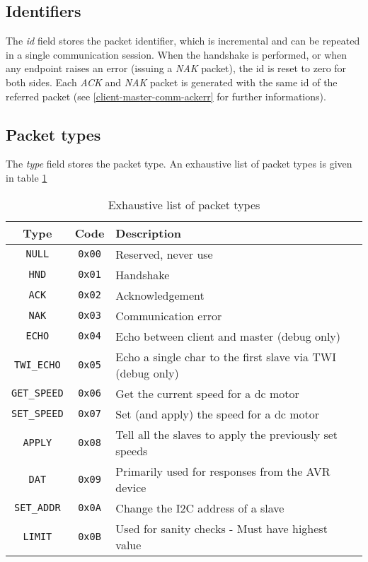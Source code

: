 \subsection{Identifiers}
The \emph{id} field stores the packet identifier, which is incremental and can
be repeated in a single communication session. When the handshake is performed,
or when any endpoint raises an error (issuing a \emph{NAK} packet), the id is
reset to zero for both sides. Each \emph{ACK} and \emph{NAK} packet is
generated with the same id of the referred packet (see
\ref{client-master-comm-ackerr} for further informations).

\subsection{Packet types}
The \emph{type} field stores the packet type. An exhaustive list of packet
types is given in table \ref{tab:packet-types}

\begin{table}[bh]
  \begin{tabularx}{\textwidth}{c c X}
    \toprule
    Type & Code & Description \\
    \midrule
    \texttt{NULL}       & \texttt{0x00} & Reserved, never use \\
    \texttt{HND}        & \texttt{0x01} & Handshake \\
    \texttt{ACK}        & \texttt{0x02} & Acknowledgement \\
    \texttt{NAK}        & \texttt{0x03} & Communication error \\
    \texttt{ECHO}       & \texttt{0x04} & Echo between client and master (debug only)\\
    \texttt{TWI\_ECHO}  & \texttt{0x05} & Echo a single char to the first slave via TWI (debug only)\\
    \texttt{GET\_SPEED} & \texttt{0x06} & Get the current speed for a dc motor \\
    \texttt{SET\_SPEED} & \texttt{0x07} & Set (and apply) the speed for a dc motor \\
    \texttt{APPLY}      & \texttt{0x08} & Tell all the slaves to apply the previously set speeds \\
    \texttt{DAT}        & \texttt{0x09} & Primarily used for responses from the AVR device \\
    \texttt{SET\_ADDR}  & \texttt{0x0A} & Change the I2C address of a slave \\
    \texttt{LIMIT}      & \texttt{0x0B} & Used for sanity checks - Must have highest value \\
    \bottomrule
  \end{tabularx}
  \caption{Exhaustive list of packet types}
  \label{tab:packet-types}
\end{table}

